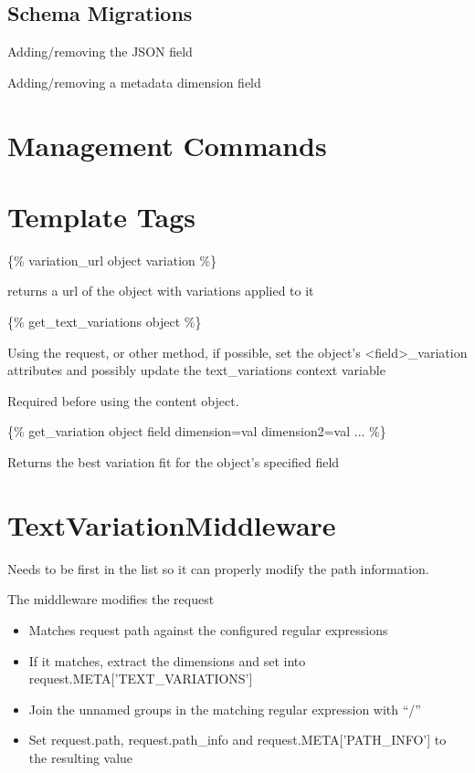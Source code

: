 \documentclass[letterpaper,10pt,english]{sphinxmanual}
\begin{document}
\subsection{Schema Migrations}
\label{reference/implementation_notes:schema-migrations}
Adding/removing the JSON field

Adding/removing a metadata dimension field


\section{Management Commands}
\label{reference/management_commands:management-commands}\label{reference/management_commands::doc}

\section{Template Tags}
\label{reference/template_tags::doc}\label{reference/template_tags:template-tags}
\{\% variation\_url object variation \%\}

returns a url of the object with variations applied to it

\{\% get\_text\_variations object \%\}

Using the request, or other method, if possible, set the object's \textless{}field\textgreater{}\_variation attributes and possibly update the text\_variations context variable

Required before using the content object.

\{\% get\_variation object field dimension=val dimension2=val ... \%\}

Returns the best variation fit for the object's specified field


\section{TextVariationMiddleware}
\label{reference/middleware:textvariationmiddleware}\label{reference/middleware::doc}\label{reference/middleware:id1}
Needs to be first in the list so it can properly modify the path information.

The middleware modifies the request
\begin{itemize}
\item {} 
Matches request path against the configured regular expressions

\item {} 
If it matches, extract the dimensions and set into request.META{[}'TEXT\_VARIATIONS'{]}

\item {} 
Join the unnamed groups in the matching regular expression with ``/''

\item {} 
Set request.path, request.path\_info and request.META{[}'PATH\_INFO'{]} to the resulting value

\end{itemize}
\end{document}
